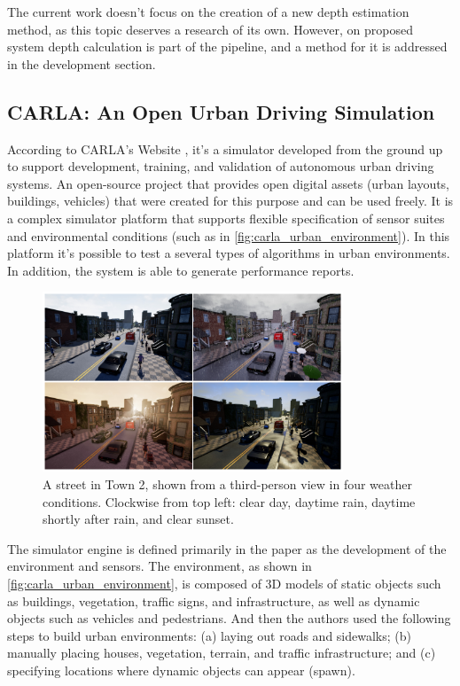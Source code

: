     The current work doesn't focus on the creation of a new depth estimation method, as this topic deserves a research of its own. However, on proposed system depth calculation is part of the pipeline, and a method for it is addressed in the development section.

\subsection{CARLA: An Open Urban Driving Simulation}

    According to CARLA's Website \cite{carla-official-website}, it's a simulator developed from the ground up to support development, training, and validation of autonomous urban driving systems. An open-source project that provides open digital assets (urban layouts, buildings, vehicles) that were created for this purpose and can be used freely. It is a complex simulator platform that supports flexible specification of sensor suites and environmental conditions (such as in \autoref{fig:carla_urban_environment}). In this platform it's possible to test a several types of algorithms in urban environments. In addition, the system is able to generate performance reports.
    
    \begin{figure}[H]
     \caption{\label{fig:carla_urban_environment}
A street in Town 2, shown from a third-person view in four weather conditions. Clockwise from top left: clear day, daytime rain, daytime shortly after rain, and clear sunset.}
     \begin{center}
        \includegraphics[width=0.8\textwidth]{images/urban_environment.png}
     \end{center}
    \end{figure}
    
    The simulator engine is defined primarily in the paper \cite{Dosovitskiy17} as the development of the environment and sensors. The environment, as shown in \autoref{fig:carla_urban_environment}, is composed of 3D models of static objects such as buildings, vegetation, traffic signs, and infrastructure, as well as dynamic objects such as vehicles and pedestrians. And then the authors used the following steps to build urban environments: (a) laying out roads and sidewalks; (b) manually placing houses, vegetation, terrain, and traffic infrastructure; and (c) specifying locations where dynamic objects can appear (spawn).
    
